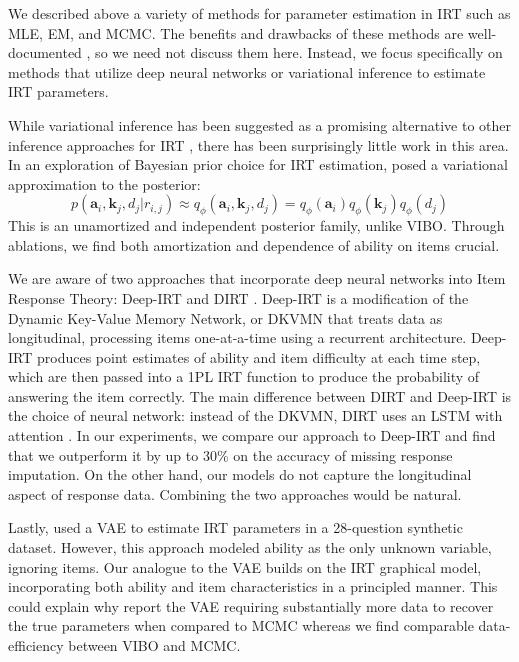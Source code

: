 We described above a variety of methods for parameter estimation in IRT such as MLE, EM, and MCMC. The benefits and drawbacks of these methods are well-documented \cite{van2017handbook}, so we need not discuss them here. 
Instead, we focus specifically on methods that utilize deep neural networks or variational inference to estimate IRT parameters.

While variational inference has been suggested as a promising alternative to other inference approaches for IRT \cite{van2017handbook}, there has been surprisingly little work in this area.
In an exploration of Bayesian prior choice for IRT estimation, \cite{natesan2016bayesian} posed a variational approximation to the posterior:
\begin{equation}
    p(\textbf{a}_i, \textbf{k}_j, d_j|r_{i,j}) \approx q_\phi(\textbf{a}_i, \textbf{k}_j, d_j) = q_\phi(\textbf{a}_i)q_\phi(\textbf{k}_j)q_\phi(d_j)
    \label{eq:natesan}
\end{equation}
This is an unamortized and independent posterior family, unlike VIBO.
Through ablations, we find both amortization and dependence of ability on items crucial.

We are aware of two approaches that incorporate deep neural networks into Item Response Theory: Deep-IRT \cite{yeung2019deep} and DIRT \cite{cheng2019dirt}. Deep-IRT is a modification of the Dynamic Key-Value Memory Network, or DKVMN \cite{zhang2017dynamic} that treats data as longitudinal, processing items one-at-a-time using a recurrent architecture. Deep-IRT produces point estimates of ability and item difficulty at each time step, which are then passed into a 1PL IRT function to produce the probability of answering the item correctly.
The main difference between DIRT and Deep-IRT is the choice of neural network: instead of the DKVMN, DIRT uses an LSTM with attention \cite{vaswani2017attention}.
In our experiments, we compare our approach to Deep-IRT and find that we outperform it by up to 30\% on the accuracy of missing response imputation.
On the other hand, our models do not capture the longitudinal aspect of response data.
Combining the two approaches would be natural.

Lastly, \cite{curi2019interpretable} used a VAE to estimate IRT parameters in a 28-question synthetic dataset.
However, this approach modeled ability as the only unknown variable, ignoring items.
Our analogue to the VAE builds on the IRT graphical model, incorporating both ability and item characteristics in a principled manner.
This could explain why \cite{curi2019interpretable} report the VAE requiring substantially more data to recover the true parameters when compared to MCMC whereas we find comparable data-efficiency between VIBO and MCMC.

